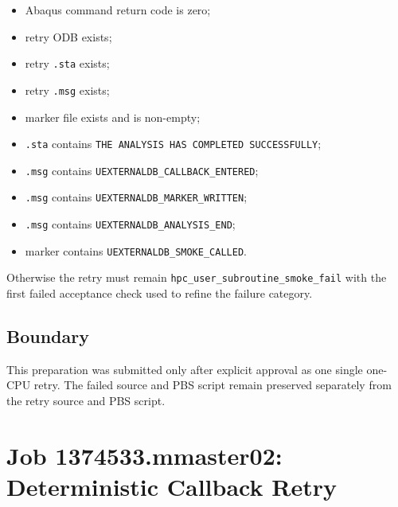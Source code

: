 \documentclass[11pt,a4paper]{article}
\begin{document}
\begin{itemize}
  \item Abaqus command return code is zero;
  \item retry ODB exists;
  \item retry \texttt{.sta} exists;
  \item retry \texttt{.msg} exists;
  \item marker file exists and is non-empty;
  \item \texttt{.sta} contains \texttt{THE ANALYSIS HAS COMPLETED SUCCESSFULLY};
  \item \texttt{.msg} contains \texttt{UEXTERNALDB\_CALLBACK\_ENTERED};
  \item \texttt{.msg} contains \texttt{UEXTERNALDB\_MARKER\_WRITTEN};
  \item \texttt{.msg} contains \texttt{UEXTERNALDB\_ANALYSIS\_END};
  \item marker contains \texttt{UEXTERNALDB\_SMOKE\_CALLED}.
\end{itemize}

Otherwise the retry must remain \texttt{hpc\_user\_subroutine\_smoke\_fail} with the first failed acceptance check used to refine the failure category.

\subsection*{Boundary}

This preparation was submitted only after explicit approval as one single one-CPU retry. The failed source and PBS script remain preserved separately from the retry source and PBS script.

\section{Job 1374533.mmaster02: Deterministic Callback Retry}
\end{document}
